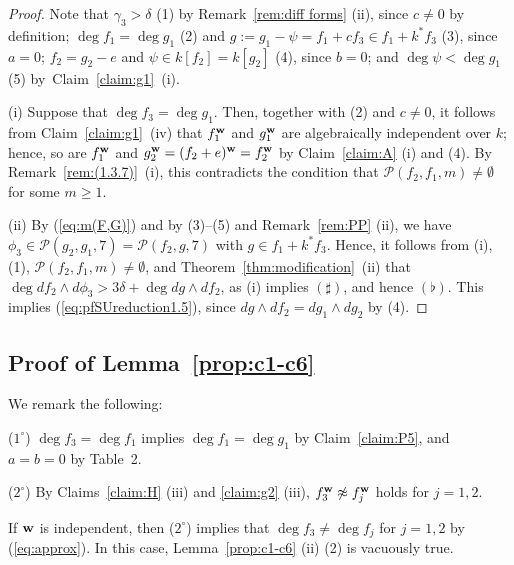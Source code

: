 \documentclass{amsart}
\theoremstyle{plain}
\theoremstyle{definition}
\newcommand{\nd}{\noindent}
\newcommand{\w}{{\bf w}}
\begin{document}
\begin{proof}
Note that 
$\gamma _3>\delta $ (1) by Remark~\ref{rem:diff forms} (ii), 
since $c\ne 0$ by definition; 
$\deg f_1=\deg g_1$ (2) 
and $g:=g_1-\psi =f_1+cf_3\in f_1+k^*f_3$ (3), 
since $a=0$; 
$f_2=g_2-e$ and $\psi \in k[f_2]=k[g_2]$ (4), 
since $b=0$; 
and $\deg \psi <\deg g_1$ (5) by~Claim~\ref{claim:g1}~(i). 


(i) 
Suppose that $\deg f_3=\deg g_1$. 
Then, together with (2) and $c\ne 0$, 
it follows from Claim~\ref{claim:g1}~(iv) that 
$f_1^{\w }$ and $g_1^{\w }$ are algebraically independent over $k$; 
hence, so are $f_1^{\w }$ and $g_2^{\w }=(f_2+e)^{\w }=f_2^{\w }$ 
by Claim~\ref{claim:A} (i) and (4). 
By Remark~\ref{rem:(1.3.7)}~(i), 
this contradicts the condition that 
$\mathcal{P}(f_2,f_1,m)\ne \emptyset $ for some $m\ge 1$. 



(ii) 
By (\ref{eq:m(F,G)}) and by (3)--(5) and Remark~\ref{rem:PP} (ii), 
we have 
$\phi _3\in \mathcal{P}(g_2,g_1,7)=\mathcal{P}(f_2,g,7)$ 
with $g\in f_1+k^*f_3$. 
Hence, 
it follows from 
(i), (1), $\mathcal{P}(f_2,f_1,m)\ne \emptyset $, 
and Theorem~\ref{thm:modification}~(ii) that 
$\deg df_2\wedge d\phi _3>3\delta +\deg dg\wedge df_2$, 
as (i) implies $(\sharp )$, and hence $(\flat )$. 
This implies (\ref{eq:pfSUreduction1.5}), 
since $dg\wedge df_2=dg_1\wedge dg_2$ by (4). 
\end{proof}




\subsection{Proof of Lemma~{\rm \ref{prop:c1-c6}}}\label{subsect:pf of lem 3}
We remark the following: 


\nd 
($1^\circ $) 
$\deg f_3=\deg f_1$ implies 
$\deg f_1=\deg g_1$ by Claim~\ref{claim:P5}, 
and $a=b=0$ by Table~2. 


\nd 
($2^\circ $) 
By Claims~\ref{claim:H} (iii) and \ref{claim:g2} (iii), 
$f_3^{\w }\not\approx f_j^{\w }$ holds for $j=1,2$. 


If $\w $ is independent, 
then ($2^\circ $) implies that $\deg f_3\ne \deg f_j$ for $j=1,2$ 
by (\ref{eq:approx}). 
In this case, 
Lemma~{\rm \ref{prop:c1-c6}} (ii) (2) is vacuously true. 
\end{document}
